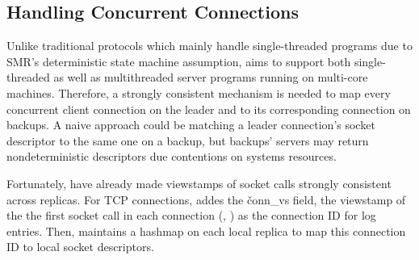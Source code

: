 


\subsection{Handling Concurrent Connections} \label{sec:concurrent}

Unlike traditional \paxos protocols which mainly handle single-threaded 
programs due to SMR's deterministic state machine assumption, \xxx aims to 
support both single-threaded as well as multithreaded server programs running 
on multi-core machines. Therefore, a strongly consistent mechanism is needed to 
map every concurrent client connection on the leader and to its corresponding 
connection on backups. A naive approach could be matching a leader connection's 
socket descriptor to the same one on a backup, but backups' servers may return 
nondeterministic descriptors due contentions on systems resources.

Fortunately, \paxos have already made viewstamps of socket calls strongly 
consistent across replicas. For TCP connections, \xxx addes the 
\v{conn\_vs} field, the viewstamp of the the first socket call in each 
connection (\ie, \accept) as the connection ID for log entries. Then, \xxx 
maintains a hashmap on each local replica to map this connection ID to local 
socket descriptors.

